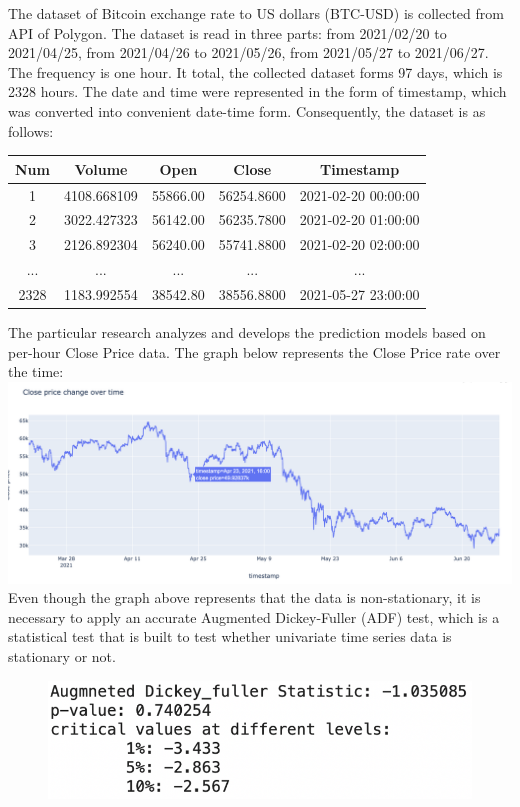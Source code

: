 The dataset of Bitcoin exchange rate to US dollars (BTC-USD) is collected from API of Polygon. The dataset is read in three parts: from 2021/02/20 to 2021/04/25, from 2021/04/26 to 2021/05/26, from 2021/05/27 to 2021/06/27. The frequency is one hour. It total, the collected dataset forms 97 days, which is 2328 hours. 
The date and time were represented in the form of timestamp, which was converted into convenient date-time form. Consequently, the dataset is as follows: \\
\begin{table}[!ht]
\centering
 \begin{tabular}{||c c c c c||} 
 \hline
 Num & Volume & Open & Close & Timestamp \\ [0.5ex] 
 \hline\hline
 1 & 4108.668109 & 55866.00 & 56254.8600 & 2021-02-20 00:00:00\\ 
 2 & 3022.427323 & 56142.00 & 56235.7800 & 2021-02-20 01:00:00\\
 3 & 2126.892304 & 56240.00 & 55741.8800 & 2021-02-20 02:00:00\\
 ... & ... & ... & ... & ... \\
 2328 & 1183.992554 & 38542.80 & 38556.8800 & 2021-05-27 23:00:00 \\ [1ex] 
 \hline
 \end{tabular}
\end{table}

The particular research analyzes and develops the prediction models based on per-hour Close Price data. The graph below represents the Close Price rate over the time:\\
\includegraphics[width=\textwidth]{images/data.png}
Even though the graph above represents that the data is non-stationary, it is necessary to apply an accurate Augmented Dickey-Fuller (ADF) test, which is a statistical test that is built to test whether univariate time series data is stationary or not.

\begin{figure}
\includegraphics[width=0.9\linewidth]{images/adf.png} 
\label{fig:wrapfig}
\end{figure}


